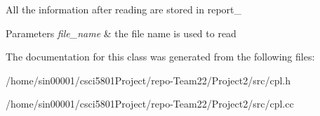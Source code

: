 All the information after reading are stored in report\+\_\+


\begin{DoxyParams}{Parameters}
{\em file\+\_\+name} & the file name is used to read \\
\hline
\end{DoxyParams}


The documentation for this class was generated from the following files\+:\begin{DoxyCompactItemize}
\item 
/home/sin00001/csci5801\+Project/repo-\/\+Team22/\+Project2/src/cpl.\+h\item 
/home/sin00001/csci5801\+Project/repo-\/\+Team22/\+Project2/src/cpl.\+cc\end{DoxyCompactItemize}
